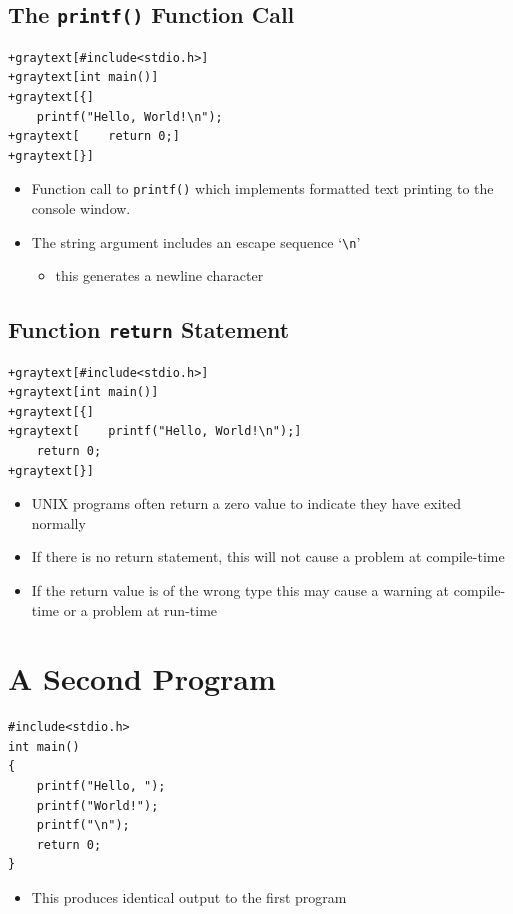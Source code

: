 \documentclass{article}
\begin{document}
\subsection{The \texttt{printf()} Function Call}
\begin{Verbatim}[commandchars=+\[\]]
+graytext[#include<stdio.h>]
+graytext[int main()]
+graytext[{]
    printf("Hello, World!\n");
+graytext[    return 0;]
+graytext[}]
\end{Verbatim}

\begin{itemize}
\item Function call to \verb!printf()! which implements formatted text printing to the console window.
\item The string argument includes an escape sequence `\verb!\n!'
\begin{itemize}
\item this generates a newline character
\end{itemize}
\end{itemize}



\subsection{Function \texttt{return} Statement}
\begin{Verbatim}[commandchars=+\[\]]
+graytext[#include<stdio.h>]
+graytext[int main()]
+graytext[{]
+graytext[    printf("Hello, World!\n");]
    return 0;
+graytext[}]
\end{Verbatim}

\begin{itemize}
\item UNIX programs often return a zero value to indicate they have exited normally
\item If there is no return statement, this will not cause a problem at compile-time
\item If the return value is of the wrong type this may cause a warning at compile-time or a problem at run-time
\end{itemize}



\section{A Second Program}
\begin{verbatim}
#include<stdio.h>
int main()
{
    printf("Hello, ");
    printf("World!");
    printf("\n");
    return 0;
}
\end{verbatim}
\begin{itemize}
\item This produces identical output to the first program
\end{itemize}
\end{document}
